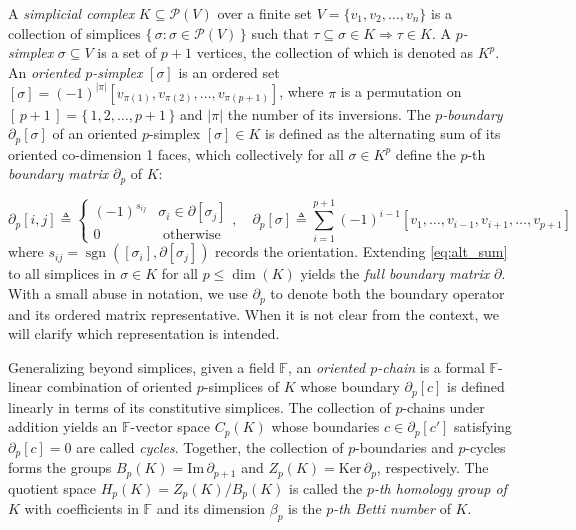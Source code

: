 \documentclass[pdflatex,sn-mathphys-num]{sn-jnl}
\begin{document}
A \emph{simplicial complex} \(K \subseteq \mathcal{P}(V)\) over a finite set \(V = \{ v_{1},v_{2},\ldots,v_{n}\}\) is a collection of simplices \(\{\,\sigma:\sigma \in \mathcal{P}(V)\,\}\) such that \(\tau \subseteq \sigma \in K \Rightarrow \tau \in K\). A \emph{\(p\)-simplex} \(\sigma \subseteq V\) is a set of \(p + 1\) vertices, the collection of which is denoted as \(K^{p}\). An \emph{oriented \(p\)-simplex} \( [\sigma] \) is an ordered set \( [\sigma]  = ( - 1)^{|\pi|} \left[ v_{\pi(1)},v_{\pi(2)},\ldots,v_{\pi(p + 1)} \right] \), where \(\pi\) is a permutation on \( [\, p + 1\,]  = \{\, 1,2,\ldots,p + 1\,\}\) and \(|\pi|\) the number of its inversions. The \emph{\(p\)-boundary} \(\partial_{p} [\sigma] \) of an oriented \(p\)-simplex \( [\sigma]  \in K\) is defined as the alternating sum of its oriented co-dimension 1 faces, which collectively for all \(\sigma \in K^{p}\) define the \(p\)-th \emph{boundary matrix} \(\partial_{p}\) of \(K\):

\begin{equation*}
\partial_p[i, j] \triangleq 
\begin{cases}
(-1)^{s_{i j}} & \sigma_i \in \partial\left[\sigma_j\right] \\
0 & \text { otherwise }
\end{cases}, 
\quad \partial_p[\sigma] \triangleq \sum_{i=1}^{p+1}(-1)^{i-1} [v_1, \dots, v_{i-1}, v_{i+1}, \dots, v_{p+1}]
\end{equation*}\label{eq:alt_sum}
\noindent
where \(s_{ij} = \operatorname{sgn} \left(  \left[ \sigma_{i} \right] ,\partial \left[ \sigma_{j} \right]  \right) \) records the orientation. Extending \ref{eq:alt_sum} to all simplices in \(\sigma \in K\) for all \(p \leq \dim(K)\) yields the \emph{full boundary matrix} \(\partial\). With a small abuse in notation, we use \(\partial_{p}\) to denote both the boundary operator and its ordered matrix representative. When it is not clear from the context, we will clarify which representation is intended.

Generalizing beyond simplices, given a field \(\mathbb{F}\), an \emph{oriented \(p\)-chain} is a formal \(\mathbb{F}\)-linear combination of oriented \(p\)-simplices of \(K\) whose boundary \(\partial_{p} [ c] \) is defined linearly in terms of its constitutive simplices. The collection of \(p\)-chains under addition yields an \(\mathbb{F}\)-vector space \(C_{p}(K)\) whose boundaries \(c \in \partial_{p} [ c'] \) satisfying \(\partial_{p} [c]  = 0\) are called \emph{cycles}. Together, the collection of \(p\)-boundaries and \(p\)-cycles forms the groups \(B_{p}(K) = \mathrm{Im}\,\partial_{p + 1}\) and \(Z_{p}(K) = \mathrm{Ker}\,\partial_{p}\), respectively. The quotient space \(H_{p}(K) = Z_{p}(K)/B_{p}(K)\) is called the \emph{\(p\)-th homology group of \(K\)} with coefficients in \(\mathbb{F}\) and its dimension \(\beta_{p}\) is the \emph{\(p\)-th Betti number} of \(K\).
\end{document}
